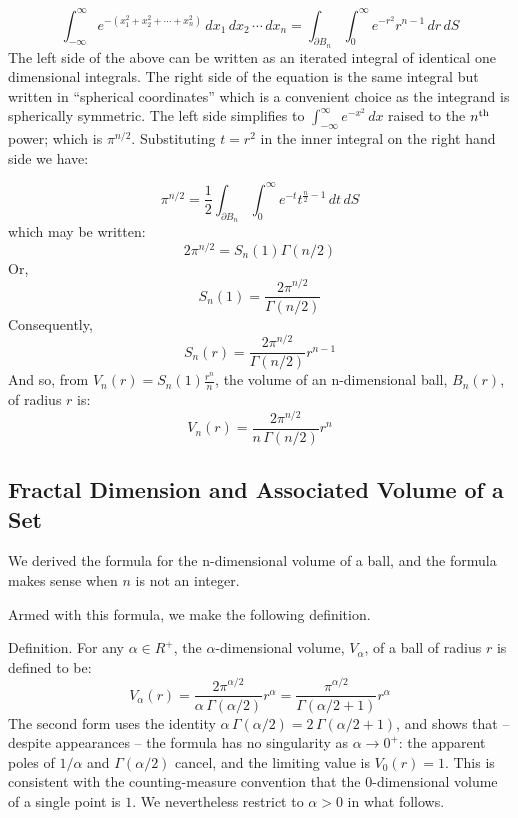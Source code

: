 $$
\int_{-\infty}^{\infty} e^{-(x_1^2 + x_2^2 + \cdots + x_n^2)} \, dx_1\, dx_2
\, \cdots \, dx_n = \int_{\partial B_n} \int_0^\infty e^{-r^2} r^{n-1} \,
dr\, dS
$$
The left side of the above can be written as an iterated integral of identical 
one dimensional integrals. The right side of the equation is the same 
integral but written in ``spherical coordinates'' which is a convenient choice as 
the integrand is spherically symmetric. The left side simplifies to 
$\int_{-\infty}^{\infty} e^{-x^2} \, dx$ raised to the $n^{\rm th}$ power;
which is $\pi^{n/2}$. Substituting $t = r^2$ in the inner integral on
the right hand side we have:

$$
\pi^{n/2} = \frac{1}{2} \int_{\partial B_n} \int_0^\infty 
e^{-t} t^{\frac{n}{2}-1} \,dt \, dS
$$
which may be written:%
$$
2 \pi^{n/2} = {S}_n(1) \Gamma(n/2)
$$
Or,
$$
{S}_n(1) = \frac{2 \pi^{n/2}}{\Gamma(n/2)}
$$
Consequently,%
$$
{S}_n(r) = \frac{2 \pi^{n/2}}{\Gamma(n/2)}r^{n-1}
$$
And so, from ${V}_n(r) = {S}_n(1) \frac{r^n}{n}$, the volume of an
n-dimensional ball, $B_n(r)$, of radius $r$ is:
$$
{V}_n(r) = \frac{2\pi^{n/2}}{n \, \Gamma(n/2)} r^n
$$

\subsection{Fractal Dimension and Associated Volume of a Set}
We derived the formula for the n-dimensional volume of a ball,
and the formula makes sense when $n$ is not an integer.

Armed with this formula, we make
the following definition.

\proclaim Definition. For any $\alpha \in R^+$, the $\alpha$-dimensional
volume, $V_\alpha$, of a ball
of radius $r$ is defined to be:%
$$
{V}_\alpha(r) = \frac{2\pi^{\alpha/2}}{\alpha \, \Gamma(\alpha/2)} r^\alpha
= \frac{\pi^{\alpha/2}}{\Gamma(\alpha/2 + 1)} r^\alpha
$$
The second form uses the identity $\alpha \, \Gamma(\alpha/2) =
2 \, \Gamma(\alpha/2 + 1)$, and shows that -- despite appearances -- the
formula has no singularity as $\alpha \rightarrow 0^+$: the apparent poles
of $1/\alpha$ and $\Gamma(\alpha/2)$ cancel, and the limiting value is
$V_0(r) = 1$. This is consistent with the counting-measure convention that
the $0$-dimensional volume of a single point is $1$. We nevertheless
restrict to $\alpha > 0$ in what follows.

